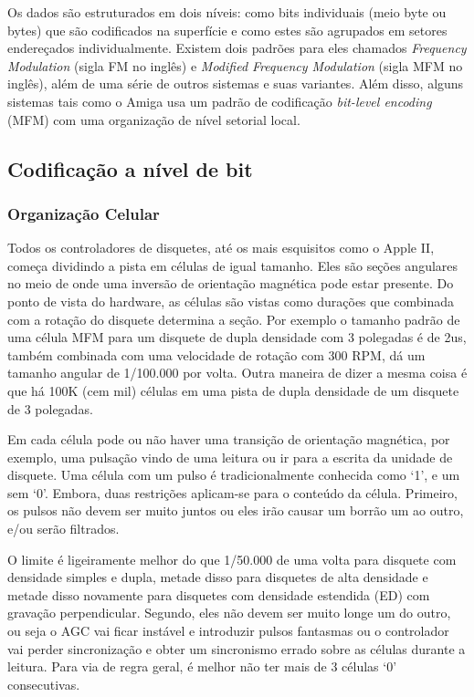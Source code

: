 \documentclass[letterpaper,10pt,brazil]{sphinxmanual}
\begin{document}
Os dados são estruturados em dois níveis: como bits individuais (meio
byte ou bytes) que são codificados na superfície e como estes são
agrupados em setores endereçados individualmente. Existem dois padrões
para eles chamados \emph{Frequency Modulation} (sigla FM no inglês) e
\emph{Modified Frequency Modulation} (sigla MFM no inglês), além de uma
série de outros sistemas e suas variantes. Além disso, alguns sistemas
tais como o Amiga usa um padrão de codificação \emph{bit-level encoding}
(MFM) com uma organização de nível setorial local.


\subsection{Codificação a nível de bit}
\label{techspecs/floppy:codificacao-a-nivel-de-bit}

\subsubsection{Organização Celular}
\label{techspecs/floppy:organizacao-celular}
Todos os controladores de disquetes, até os mais esquisitos como o
Apple II, começa dividindo a pista em células de igual tamanho. Eles são
seções angulares no meio de onde uma inversão de orientação magnética
pode estar presente. Do ponto de vista do hardware, as células são
vistas como durações que combinada com a rotação do disquete determina
a seção. Por exemplo o tamanho padrão de uma célula MFM para um disquete
de dupla densidade com 3 polegadas é de 2us, também combinada com uma
velocidade de rotação com 300 RPM, dá um tamanho angular de 1/100.000
por volta. Outra maneira de dizer a mesma coisa é que há 100K (cem mil)
células em uma pista de dupla densidade de um disquete de 3 polegadas.

Em cada célula pode ou não haver uma transição de orientação magnética,
por exemplo, uma pulsação vindo de uma leitura ou ir para a escrita da
unidade de disquete. Uma célula com um pulso é tradicionalmente
conhecida como `1', e um sem `0'. Embora, duas restrições aplicam-se
para o conteúdo da célula. Primeiro, os pulsos não devem ser muito
juntos ou eles irão causar um borrão um ao outro, e/ou serão filtrados.

O limite é ligeiramente melhor do que 1/50.000 de uma volta para
disquete com densidade simples e dupla, metade disso para disquetes
de alta densidade e metade disso novamente para disquetes com densidade
estendida (ED) com gravação perpendicular. Segundo, eles não devem ser
muito longe um do outro, ou seja o AGC vai ficar instável e introduzir
pulsos fantasmas ou o controlador vai perder sincronização e obter um
sincronismo errado sobre as células durante a leitura.
Para via de regra geral, é melhor não ter mais de 3 células `0'
consecutivas.
\end{document}

